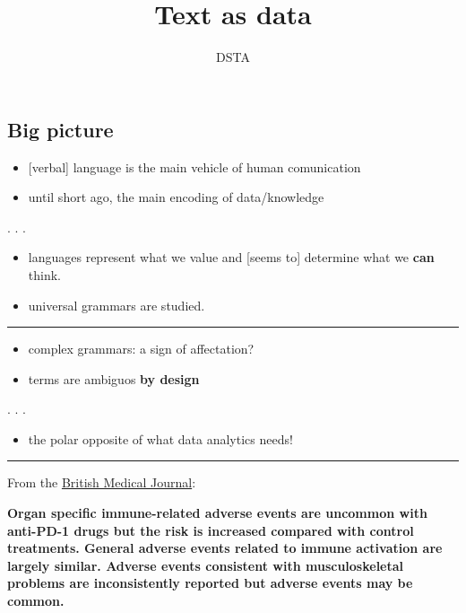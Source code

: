 \documentclass[
  letterpaper,
  DIV=11,
  numbers=noendperiod]{scrartcl}
\title{Text as data}
\author{DSTA}
\date{}
\providecommand{\tightlist}{%
  \setlength{\itemsep}{0pt}\setlength{\parskip}{0pt}}\usepackage{longtable,booktabs,array}
\begin{document}
\maketitle

\subsection{Big picture}\label{big-picture}

\begin{itemize}
\item
  {[}verbal{]} language is the main vehicle of human comunication
\item
  until short ago, the main encoding of data/knowledge
\end{itemize}

. . .

\begin{itemize}
\item
  languages represent what we value and {[}seems to{]} determine what we
  \textbf{can} think.
\item
  universal grammars are studied.
\end{itemize}

\begin{center}\rule{0.5\linewidth}{0.5pt}\end{center}

\begin{itemize}
\item
  complex grammars: a sign of affectation?
\item
  terms are ambiguos \textbf{by design}
\end{itemize}

. . .

\begin{itemize}
\tightlist
\item
  the polar opposite of what data analytics needs!
\end{itemize}

\begin{center}\rule{0.5\linewidth}{0.5pt}\end{center}

From the \href{http://www.bmj.com/content/360/bmj.k793}{British Medical
Journal}:

\textbf{Organ specific immune-related adverse events are uncommon with
anti-PD-1 drugs but the risk is increased compared with control
treatments. General adverse events related to immune activation are
largely similar. Adverse events consistent with musculoskeletal problems
are inconsistently reported but adverse events may be common.}
\end{document}
